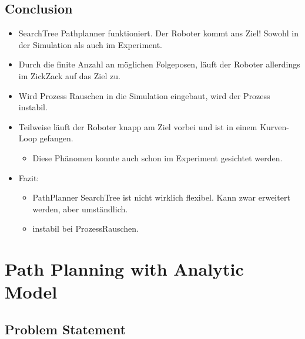 \documentclass[10pt,a4paper]{article}
\begin{document}
\subsection{Conclusion}

\begin{itemize}
	\item SearchTree Pathplanner funktioniert. Der Roboter kommt ans Ziel! Sowohl in der Simulation als auch im Experiment.
	\item Durch die finite Anzahl an möglichen Folgeposen, läuft der Roboter allerdings im ZickZack auf das Ziel zu.
	\item Wird Prozess Rauschen in die Simulation eingebaut, wird der Prozess instabil.
	\item Teilweise läuft der Roboter knapp am Ziel vorbei und ist in einem Kurven-Loop gefangen.
	\begin{itemize}
		\item Diese Phänomen konnte auch schon im Experiment gesichtet werden.
	\end{itemize}
	\item Fazit:
	\begin{itemize}
		\item PathPlanner SearchTree ist nicht wirklich flexibel. Kann zwar erweitert werden, aber umständlich.
		\item instabil bei ProzessRauschen.
	\end{itemize}	 
	
	

\end{itemize}




\section{Path Planning with Analytic Model}

\subsection{Problem Statement}
\end{document}

